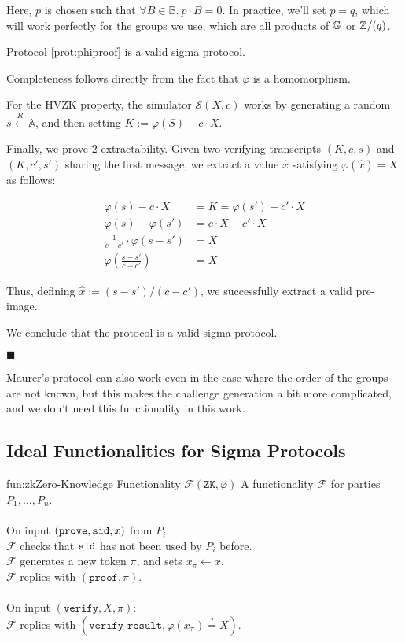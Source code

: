 Here, $p$ is chosen such that $\forall B \in \mathbb{B}.\ p \cdot B = 0$.
In practice, we'll set $p = q$, which will work perfectly for the groups
we use, which are all products of $\mathbb{G}$ or $\mathbb{Z}/(q)$.

\begin{claim}
    Protocol \ref{prot:phiproof} is a valid sigma protocol.
\end{claim}

Completeness follows directly from the fact that $\varphi$ is a homomorphism.

For the HVZK property, the simulator $\mathcal{S}(X, c)$ works by generating
a random $s \xleftarrow{R} \mathbb{A}$, and then setting $K := \varphi(S) - c \cdot X$.

Finally, we prove $2$-extractability. Given two verifying transcripts
$(K, c, s)$ and $(K, c', s')$ sharing the first message, we extract
a value $\hat{x}$ satisfying $\varphi(\hat{x}) = X$ as follows:

$$
\begin{aligned}
\varphi(s) - c \cdot X &= K = \varphi(s') - c' \cdot X\\
\varphi(s) - \varphi(s') &= c \cdot X - c' \cdot X\\
\frac{1}{c - c'} \cdot \varphi(s - s') &= X\\
\varphi \left(\frac{s - s'}{c - c'}\right) &= X
\end{aligned}
$$

Thus, defining $\hat{x} := (s - s') / (c - c')$, we successfully extract
a valid pre-image.

We conclude that the protocol is a valid sigma protocol.

$\blacksquare$

Maurer's protocol can also work even in the case where the order of
the groups are not known, but this makes the challenge generation
a bit more complicated, and we don't need this functionality in
this work.

\subsection{Ideal Functionalities for Sigma Protocols}

\begin{afunctionality}{fun:zk}{Zero-Knowledge Functionality $\mathcal{F}(\texttt{ZK}, \varphi)$}
A functionality $\mathcal{F}$ for parties $P_1, \ldots, P_n$.\\
\\
On input $(\texttt{prove}, \texttt{sid}, x)$ from $P_i$:\\
$\mathcal{F}$ checks that $\texttt{sid}$ has not been used by $P_i$ before.\\
$\mathcal{F}$ generates a new token $\pi$, and sets $x_\pi \gets x$.\\
$\mathcal{F}$ replies with $(\texttt{proof}, \pi)$.\\
\\
On input $(\texttt{verify}, X, \pi)$:\\
$\mathcal{F}$ replies with $(\texttt{verify-result}, \varphi(x_\pi) \stackrel{?}{=} X)$.\\


\end{afunctionality}

